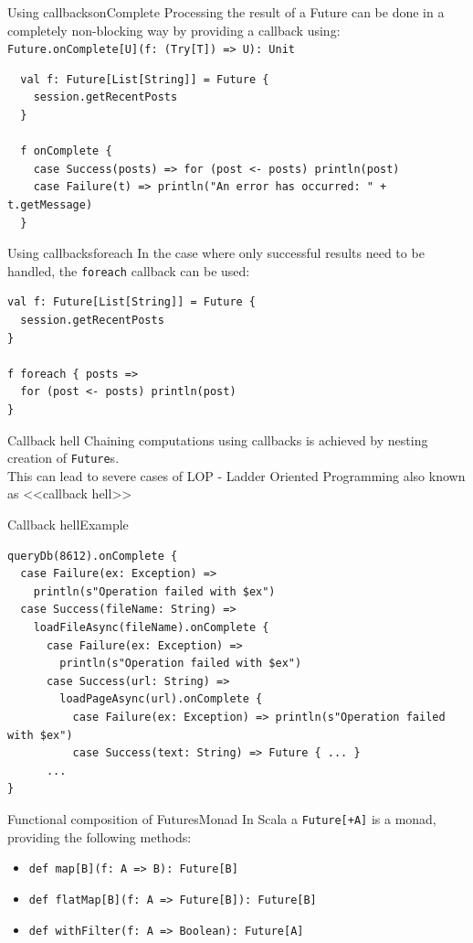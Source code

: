 \documentclass[aspectratio=169]{beamer}
\begin{document}
\begin{frame}[fragile]{Using callbacks}{onComplete}
  Processing the result of a Future can be done in a completely non-blocking way by providing a
  callback using: \texttt{Future.onComplete[U](f: (Try[T]) => U): Unit}
  \bigskip
  \begin{verbatim}
  val f: Future[List[String]] = Future {
    session.getRecentPosts
  }

  f onComplete {
    case Success(posts) => for (post <- posts) println(post)
    case Failure(t) => println("An error has occurred: " + t.getMessage)
  }
  \end{verbatim}
\end{frame}

\begin{frame}[fragile]{Using callbacks}{foreach}
In the case where only successful results need to be handled, the \texttt{foreach} callback can be used:
\bigskip
\begin{verbatim}
val f: Future[List[String]] = Future {
  session.getRecentPosts
}

f foreach { posts =>
  for (post <- posts) println(post)
}
\end{verbatim}
\end{frame}

\begin{frame}{Callback hell}
  Chaining computations using callbacks is achieved by nesting creation of \texttt{Future}s.\\
  This can lead to severe cases of LOP - Ladder Oriented Programming also known as <<callback hell>>\\
\end{frame}

\begin{frame}[fragile]{Callback hell}{Example}
\begin{verbatim}
queryDb(8612).onComplete {
  case Failure(ex: Exception) => 
    println(s"Operation failed with $ex")
  case Success(fileName: String) => 
    loadFileAsync(fileName).onComplete {
      case Failure(ex: Exception) => 
        println(s"Operation failed with $ex")
      case Success(url: String) => 
        loadPageAsync(url).onComplete {
          case Failure(ex: Exception) => println(s"Operation failed with $ex")
          case Success(text: String) => Future { ... }
      ...
}
\end{verbatim}
\end{frame}

\begin{frame}{Functional composition of Futures}{Monad}
  In Scala a \texttt{Future[+A]} is a monad, providing the following methods:
  \begin{itemize}
    \item \texttt{def map[B](f: A => B): Future[B]}
    \item \texttt{def flatMap[B](f: A => Future[B]): Future[B]}
    \item \texttt{def withFilter(f: A => Boolean): Future[A]}
  \end{itemize}
\end{frame}
\end{document}
